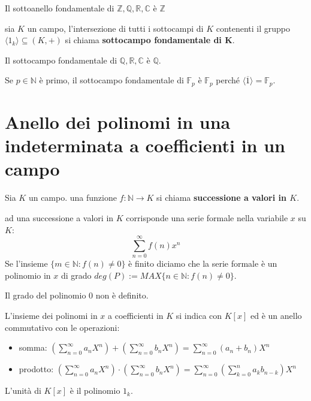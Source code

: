 \documentclass[../main.tex]{subfiles}
\begin{document}
\begin{example}
    Il sottoanello fondamentale di $\mathbb{Z},\mathbb{Q},\mathbb{R},\mathbb{C}$ è $\mathbb{Z}$
\end{example}

\begin{definition}
    sia $K$ un campo, l'intersezione di tutti i sottocampi di $K$ contenenti il gruppo $\langle1_k\rangle \subseteq (K,+)$ si chiama \textbf{sottocampo fondamentale di K}.
\end{definition}

\begin{example}
    Il sottocampo fondamentale di $\mathbb{Q},\mathbb{R},\mathbb{C}$ è $\mathbb{Q}$.

    Se $p \in \mathbb{N}$ è primo, il sottocampo fondamentale di $\mathbb{F}_p$ è $\mathbb{F}_p$ perché $\langle\overline{1}\rangle = \mathbb{F}_p$.
\end{example}

\section{Anello dei polinomi in una indeterminata a coefficienti in un campo}
\begin{definition}
    Sia $K$ un campo. una funzione $f: \mathbb{N} \rightarrow K$ si chiama \textbf{successione a valori in $K$}.
\end{definition}
ad una successione a valori in $K$ corrisponde una serie formale nella variabile $x$ su $K$:
\begin{equation*}
    \sum_{n=0}^{\infty} f(n) x^n
\end{equation*}
Se l'insieme $\{ m \in \mathbb{N} : f(n) \neq 0\}$ è finito diciamo che la serie formale è un polinomio in $x$ di grado $deg(P) := MAX \{ n \in \mathbb{N}: f(n) \neq 0\}$.

Il grado del polinomio 0 non è definito.

L'insieme dei polinomi in $x$ a coefficienti in $K$ si indica con $K[x]$ ed è un anello commutativo con le operazioni:
\begin{itemize}
    \item somma: $(\sum_{n=0}^{\infty} a_n X^n) + (\sum_{n=0}^{\infty} b_n X^n) = \sum_{n=0}^{\infty} (a_n + b_n) X^n$
    \item prodotto: $(\sum_{n=0}^{\infty} a_n X^n) \cdot (\sum_{n=0}^{\infty} b_n X^n) = \sum_{n=0}^{\infty} (\sum_{k=0}^{n} a_k b_{n-k}) X^n$
\end{itemize}
L'unità di $K[x]$ è il polinomio $1_k$.
\end{document}
